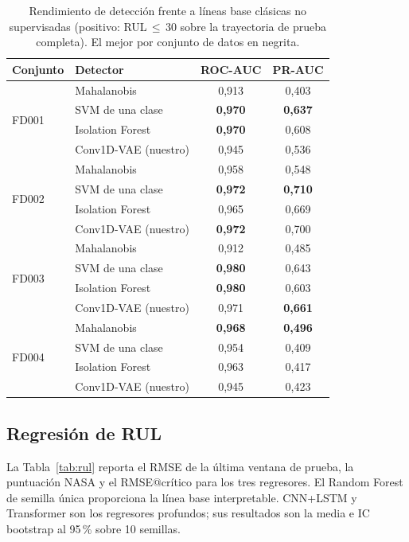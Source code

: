 \documentclass[5p,times,authoryear]{elsarticle}
\begin{document}
\begin{table}[!t]
\centering
\caption{Rendimiento de detección frente a líneas base clásicas no supervisadas (positivo: RUL\,$\le$\,30 sobre la trayectoria de prueba completa). El mejor por conjunto de datos en negrita.}
\label{tab:detbaselines}
\small
\begin{tabular}{llcc}
\toprule
Conjunto & Detector & ROC-AUC & PR-AUC \\
\midrule
\multirow{4}{*}{FD001}
 & Mahalanobis        & 0,913          & 0,403 \\
 & SVM de una clase   & \textbf{0,970} & \textbf{0,637} \\
 & Isolation Forest   & \textbf{0,970} & 0,608 \\
 & Conv1D-VAE (nuestro) & 0,945        & 0,536 \\
\multirow{4}{*}{FD002}
 & Mahalanobis        & 0,958          & 0,548 \\
 & SVM de una clase   & \textbf{0,972} & \textbf{0,710} \\
 & Isolation Forest   & 0,965          & 0,669 \\
 & Conv1D-VAE (nuestro) & \textbf{0,972} & 0,700 \\
\multirow{4}{*}{FD003}
 & Mahalanobis        & 0,912          & 0,485 \\
 & SVM de una clase   & \textbf{0,980} & 0,643 \\
 & Isolation Forest   & \textbf{0,980} & 0,603 \\
 & Conv1D-VAE (nuestro) & 0,971        & \textbf{0,661} \\
\multirow{4}{*}{FD004}
 & Mahalanobis        & \textbf{0,968} & \textbf{0,496} \\
 & SVM de una clase   & 0,954          & 0,409 \\
 & Isolation Forest   & 0,963          & 0,417 \\
 & Conv1D-VAE (nuestro) & 0,945        & 0,423 \\
\bottomrule
\end{tabular}
\end{table}

\subsection{Regresión de RUL}\label{sec:results-rul}

La Tabla~\ref{tab:rul} reporta el RMSE de la última ventana de prueba, la puntuación NASA y el RMSE@crítico para los tres regresores. El Random Forest de semilla única proporciona la línea base interpretable. CNN+LSTM y Transformer son los regresores profundos; sus resultados son la media e IC bootstrap al 95\,\% sobre 10 semillas.
\end{document}
